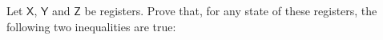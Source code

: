 \documentclass[boxes,pages,color=SeaGreen]{homework}
\renewcommand{\op}[1]{\operatorname{#1}}
\newcommand{\reg}[1]{\mathsf{#1}}
\begin{document}

\begin{problem}
Let $\reg{X}$, $\reg{Y}$ and $\reg{Z}$ be registers.
Prove that, for any state of these registers, the following two inequalities
are true:
\end{problem}
\end{document}
